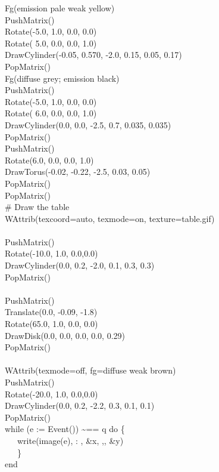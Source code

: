 {\>   Fg({\textquotedbl}emission pale weak yellow{\textquotedbl}) \\
\>   PushMatrix() \\
\>   Rotate(-5.0, 1.0, 0.0, 0.0) \\
\>   Rotate( 5.0, 0.0, 0.0, 1.0) \\
\>   DrawCylinder(-0.05, 0.570, -2.0, 0.15, 0.05, 0.17) \\
\>   PopMatrix() \\
\>   Fg({\textquotedbl}diffuse grey; emission black{\textquotedbl}) \\
\>   PushMatrix() \\
\>   Rotate(-5.0, 1.0, 0.0, 0.0) \\
\>   Rotate( 6.0, 0.0, 0.0, 1.0) \\
\>   DrawCylinder(0.0, 0.0, -2.5, 0.7, 0.035, 0.035) \\
\>   PopMatrix() \\
\>   PushMatrix() \\
\>   Rotate(6.0, 0.0, 0.0, 1.0) \\
\>   DrawTorus(-0.02, -0.22, -2.5, 0.03, 0.05) \\
\>   PopMatrix() \  \\
\>   PopMatrix()
\ \\
\>   \# Draw the table  \\
\>   WAttrib({\textquotedbl}texcoord=auto{\textquotedbl},
{\textquotedbl}texmode=on{\textquotedbl},
{\textquotedbl}texture=table.gif{\textquotedbl}) \\
\ \\
\>   PushMatrix() \\
\>   Rotate(-10.0, 1.0, 0.0,0.0) \\
\>   DrawCylinder(0.0, 0.2, -2.0, 0.1, 0.3, 0.3) \\
\>   PopMatrix() \\
\ \\
\>   PushMatrix() \\
\>   Translate(0.0, -0.09, -1.8) \\
\>   Rotate(65.0, 1.0, 0.0, 0.0) \\
\>   DrawDisk(0.0, 0.0, 0.0, 0.0, 0.29)  \\
\>   PopMatrix() \\
\ \\
\>   WAttrib({\textquotedbl}texmode=off{\textquotedbl},
{\textquotedbl}fg=diffuse weak brown{\textquotedbl}) \\
\>   PushMatrix() \\
\>   Rotate(-20.0, 1.0, 0.0,0.0) \\
\>   DrawCylinder(0.0, 0.2, -2.2, 0.3, 0.1, 0.1) \\
\>   PopMatrix() \\
\>   while (e := Event()) \~{}== {\textquotedbl}q{\textquotedbl} do \{ \\
\>   \ \ \ write(image(e), {\textquotedbl}: {\textquotedbl}, \&x,
{\textquotedbl},{\textquotedbl}, \&y) \\
\>   \ \ \ \} \\
end
}

